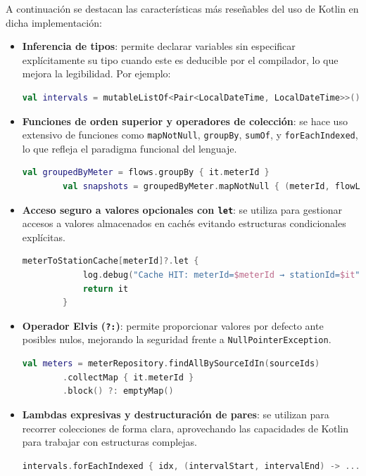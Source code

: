 A continuación se destacan las características más reseñables del uso de Kotlin en dicha implementación:

\begin{itemize}
	\item \textbf{Inferencia de tipos}: permite declarar variables sin especificar explícitamente su tipo cuando este es deducible por el compilador, lo que mejora la legibilidad. Por ejemplo:
	\begin{lstlisting}[language=Kotlin]
		val intervals = mutableListOf<Pair<LocalDateTime, LocalDateTime>>()
	\end{lstlisting}
	
	\item \textbf{Funciones de orden superior y operadores de colección}: se hace uso extensivo de funciones como \texttt{mapNotNull}, \texttt{groupBy}, \texttt{sumOf}, y \texttt{forEachIndexed}, lo que refleja el paradigma funcional del lenguaje.
	\begin{lstlisting}[language=Kotlin]
		val groupedByMeter = flows.groupBy { it.meterId }
		val snapshots = groupedByMeter.mapNotNull { (meterId, flowList) -> ... }
	\end{lstlisting}
	
	\item \textbf{Acceso seguro a valores opcionales con \texttt{let}}: se utiliza para gestionar accesos a valores almacenados en cachés evitando estructuras condicionales explícitas.
	\begin{lstlisting}[language=Kotlin]
		meterToStationCache[meterId]?.let {
			log.debug("Cache HIT: meterId=$meterId → stationId=$it")
			return it
		}
	\end{lstlisting}
	
	\item \textbf{Operador Elvis (\texttt{?:})}: permite proporcionar valores por defecto ante posibles nulos, mejorando la seguridad frente a \texttt{NullPointerException}.
	\begin{lstlisting}[language=Kotlin]
		val meters = meterRepository.findAllBySourceIdIn(sourceIds)
		.collectMap { it.meterId }
		.block() ?: emptyMap()
	\end{lstlisting}
	
	\item \textbf{Lambdas expresivas y destructuración de pares}: se utilizan para recorrer colecciones de forma clara, aprovechando las capacidades de Kotlin para trabajar con estructuras complejas.
	\begin{lstlisting}[language=Kotlin]
		intervals.forEachIndexed { idx, (intervalStart, intervalEnd) -> ... }
	\end{lstlisting}
	

\end{itemize}
